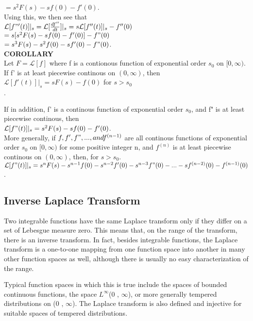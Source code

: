 \documentclass[12pt]{article}
\begin{document}
{$= s^2F(s) - sf(0) - f'(0)$.\\

Using this, we then see that\\

$\mathcal{L}[f"'(t)]|_s = \mathcal{L}[\frac{df''}{dt}]|_s = s\mathcal{L}[f''(t)]|_s - f''(0)$\\

$= s[s^2F(s) - sf(0) - f'(0)] - f"(0)$\\

$= s^3F(s) - s^2f(0) - sf'(0) - f"(0)$.\\

\textbf{COROLLARY}\\
Let $F = \mathcal{L}[f]$ where f is a contionous function of exponential order $s_0$ on $[0, \infty)$. If f' is at least piecewise continous on $(0, \infty)$, then\\

$\mathcal{L}[f'(t)]|_s = sF(s) - f(0)$		for $s>s_0$\\.

If in addition, f' is a continous function of exponential order $s_0$, and f" is at least piecewise continous, then\\

$\mathcal{L}[f"(t)]|_s = s^2F(s) - sf(0) - f'(0)$.\\

More generally, if $f, f', f", ...,and f^{(n-1)}$ are all continous functions of exponential order $s_0$ on $[0, \infty)$ for some positive integer n, and $f^{(n)}$ is at least piecewise continous on $(0, \infty)$, then, for $s>s_0$.\\

$\mathcal{L}[f"(t)]|_s = s^n F(s) - s^{n-1} f(0) - s^{n-2}f'(0) - s^{n-3}f"(0) - ... - sf^{(n-2)}(0) - f^{(n-1)}(0)$.

\subsection{Inverse Laplace Transform}
Two integrable functions have the same Laplace transform only if they differ on a set of Lebesgue measure zero. This means that, on the range of the transform, there is an inverse transform. In fact, besides integrable functions, the Laplace transform is a one-to-one mapping from one function space into another in many other function spaces as well, although there is usually no easy characterization of the range.

Typical function spaces in which this is true include the spaces of bounded continuous functions, the space $L^\infty$(0 , $\infty$), or more generally tempered distributions on (0 , $\infty$). The Laplace transform is also defined and injective for suitable spaces of tempered distributions.

}
\end{document}
